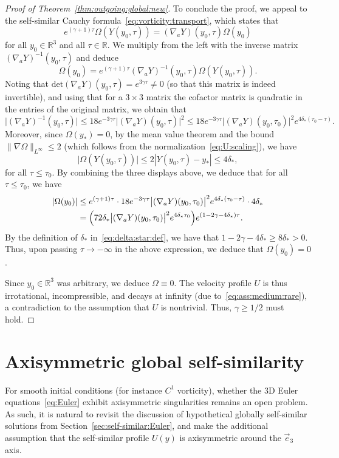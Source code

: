 \documentclass[11pt,reqno]{amsproc}
\numberwithin{equation}{section}
\theoremstyle{remark}
\begin{document}
\begin{proof}[Proof of Theorem~\ref{thm:outgoing:global:new}]
To conclude the proof, we appeal to the self-similar Cauchy formula~\eqref{eq:vorticity:transport}, which states that 
\[
e^{(\gamma+1)\tau} \Omega(Y(y_0,\tau)) =  (\nabla_a Y)(y_0,\tau) \Omega(y_0)
\]
for all $y_0 \in \mathbb{R}^3$ and all $\tau \in \mathbb{R}$. We multiply from the left with the inverse matrix $(\nabla_a Y)^{-1}(y_0,\tau)$ and deduce
\[
\Omega(y_0) 
= 
e^{(\gamma+1)\tau} (\nabla_a Y)^{-1}(y_0,\tau) \Omega(Y(y_0,\tau)) 
.
\]
Noting that $\mathrm{det}(\nabla_a Y)(y_0,\tau) = e^{3\gamma \tau}\neq 0$ (so that this matrix is indeed invertible), and using that for a $3\times3$ matrix the cofactor matrix is quadratic in the entries of the original matrix, we obtain that 
\[
\bigl|(\nabla_a Y)^{-1}(y_0,\tau)\bigr|
\leq 18 e^{-3\gamma \tau}\bigl|(\nabla_a Y)(y_0,\tau)\bigr|^2
\leq 18 e^{-3\gamma \tau}\bigl|(\nabla_a Y) (y_0,\tau_0)\bigr|^2 e^{4 \delta_*(\tau_0-\tau)}.
\]
Moreover, since $\Omega(y_*)=0$, by the mean value theorem and the bound $\|\nabla  \Omega\|_{L^\infty} \leq 2$ (which follows from the normalization~\eqref{eq:U:scaling}), we have 
\[
\bigl| \Omega(Y(y_0,\tau)) \bigr|
\leq 2 |Y(y_0,\tau)-y_*| \leq 4 \delta_*,
\]
for all $\tau \leq \tau_0$.
By combining the three displays above, we deduce that for all $\tau \leq \tau_0$, we have
\begin{align*}
|\Omega(y_0)|
&\leq e^{(\gamma+1)\tau} \cdot 18 e^{-3\gamma \tau}\bigl|(\nabla_a Y) (y_0,\tau_0)\bigr|^2 e^{4 \delta_*(\tau_0-\tau)} \cdot 4 \delta_*
\\
&= \Bigl( 72 \delta_* \bigl|(\nabla_a Y) (y_0,\tau_0)\bigr|^2 e^{4 \delta_*\tau_0} \Bigr) e^{(1-2\gamma-4\delta_*)\tau}.
\end{align*}
By the definition of $\delta_*$ in~\eqref{eq:delta:star:def}, we have that $1-2\gamma-4\delta_* \geq 8 \delta_* > 0$. Thus, upon passing $\tau \to -\infty$ in the above expression, we deduce that $\Omega(y_0) =0$. 

Since $y_0 \in \mathbb{R}^3$ was arbitrary, we deduce $\Omega \equiv 0$. The velocity profile $U$ is thus irrotational, incompressible, and decays at infinity (due to~\eqref{eq:ass:medium:rare}), a contradiction to the assumption that $U$ is nontrivial. Thus, $\gamma \geq 1/2$ must hold.
\end{proof}


\section{Axisymmetric global self-similarity}
\label{sec:axi:sym}
{For smooth initial conditions (for instance $C^1$ vorticity), whether the 3D Euler equations~\eqref{eq:Euler} exhibit axisymmetric singularities remains an open problem. As such, it is natural to revisit the discussion of hypothetical globally self-similar solutions from Section~\ref{sec:self-similar:Euler}, and make the additional assumption} that the  self-similar profile $U(y)$ is axisymmetric around the $\vec{e}_3$ axis. 
\end{document}

